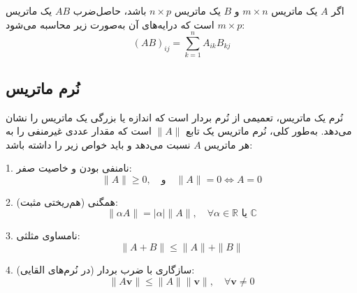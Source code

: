 \begin{definition}
	اگر $A$ یک ماتریس $m \times n$ و $B$ یک ماتریس $n \times p$ باشد، حاصل‌ضرب $AB$ یک ماتریس $m \times p$ است که درایه‌های آن به‌صورت زیر محاسبه می‌شود:
	\[ (AB)_{ij} = \sum_{k=1}^{n} A_{ik} B_{kj} \]
	
\end{definition}
\subsection{نُرم ماتریس}
نُرم یک ماتریس، تعمیمی از نُرم بردار است که اندازه یا بزرگی یک ماتریس را نشان می‌دهد. به‌طور کلی، نُرم ماتریس یک تابع $\|A\|$ است که مقدار عددی غیرمنفی را به هر ماتریس $A$ نسبت می‌دهد و باید خواص زیر را داشته باشد:
\begin{nokteh}
1. نامنفی بودن و خاصیت صفر:
\[
\|A\| \geq 0, \quad \text{و} \quad \|A\| = 0 \iff A = 0
\]

2. همگنی (هم‌ریختی مثبت):
\[
\|\alpha A\| = |\alpha| \|A\|, \quad \forall \alpha \in \mathbb{R} \text{ یا } \mathbb{C}
\]

3. نامساوی مثلثی:
\[
\|A + B\| \leq \|A\| + \|B\|
\]

4. سازگاری با ضرب بردار (در نُرم‌های القایی):
\[
\|A\mathbf{v}\| \leq \|A\| \|\mathbf{v}\|, \quad \forall \mathbf{v} \neq 0
\]
\end{nokteh}
